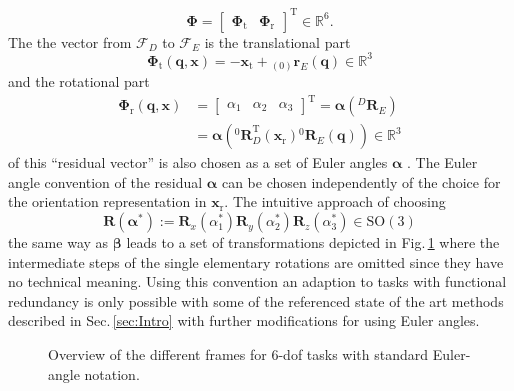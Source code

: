 \documentclass[twocolumn,10pt]{IFTOMM}
\newcommand{\bm}[1]{\boldsymbol{#1}}
\newcommand{\ortvek}[4]{{ }_{(#1)}{\boldsymbol{#2}}^{#3}_{#4} }
\newcommand{\rotmat}[2]{{{ }^{#1}\boldsymbol{R}}_{#2}}
\newcommand{\transp}[0]{{\mathrm{T}}}
\newcommand{\ks}[1]{{\mathcal{F}}_{#1}}
\begin{document}
%
\begin{equation}
\bm{\Phi}=\begin{bmatrix}
\bm{\Phi}_{\mathrm{t}} & \bm{\Phi}_{\mathrm{r}}
\end{bmatrix}^\transp \in {\mathbb{R}}^{6}.
\label{equ:Phi_def}
\end{equation}
%
The the vector from $\ks{D}$ to $\ks{E}$ is the translational part 
%
\begin{equation}
\bm{\Phi}_{\mathrm{t}}(\bm{q},\bm{x}) = - \bm{x}_{\mathrm{t}} + \ortvek{0}{r}{}{E}(\bm{q}) \in {\mathbb{R}}^{3}
\label{equ:Phit_def}
\end{equation}
%
and the rotational part
%
\begin{align}
\bm{\Phi}_{\mathrm{r}}(\bm{q},\bm{x}) &= \begin{bmatrix}
\alpha_1  & \alpha_2 & \alpha_3
\end{bmatrix}^\transp
=\bm{\alpha}\left(\rotmat{D}{E}\right)\nonumber \\
&=\bm{\alpha}\left(\rotmat{0}{D}^\transp (\bm{x}_{\mathrm{r}})\rotmat{0}{E}(\bm{q})\right) \in {\mathbb{R}}^{3}
\label{equ:Phir_def}
\end{align}
%
of this ``residual vector'' is also chosen as a set of Euler angles $\bm{\alpha}$ \cite{GoldenbergBenFen1985}.
The Euler angle convention of the residual $\bm{\alpha}$ can be chosen independently of the choice for the orientation representation in  $\bm{x}_{\mathrm{r}}$.
The intuitive approach of choosing
%
\begin{equation}
\bm{R}(\bm{\alpha}^*) := \bm{R}_x(\alpha_1^*) \bm{R}_y(\alpha_2^*) \bm{R}_z(\alpha_3^*) \in \mathrm{SO(3)}
\label{equ:alpha_convention_xyz}
\end{equation}
%
the same way as $\bm{\beta}$ leads to a set of transformations depicted in Fig.\,\ref{fig:frames_6dof} where the intermediate steps of the single elementary rotations are omitted since they have no technical meaning.
Using this convention an adaption to tasks with functional redundancy is only possible with some of the referenced state of the art methods described in Sec.\,\ref{sec:Intro} with further modifications for using Euler angles.
%
\begin{figure}[tb]
    
    \vspace{-0.2cm}
    \caption{Overview of the different frames for 6-dof tasks with standard Euler-angle notation.}
    \label{fig:frames_6dof}
\end{figure} 
\end{document}
